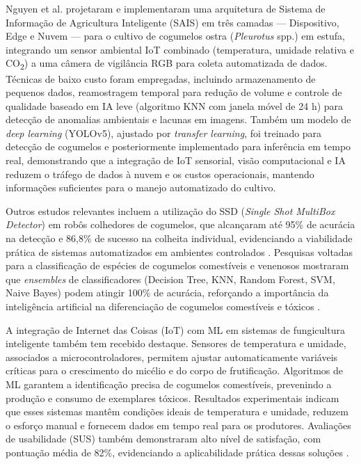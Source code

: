 \documentclass[11pt,a4paper]{article}
\begin{document}
Nguyen et al. \cite{Nguyen2024} projetaram e implementaram uma arquitetura de Sistema de Informação de Agricultura Inteligente (SAIS) em três camadas --- Dispositivo, Edge e Nuvem --- para o cultivo de cogumelos ostra (\textit{Pleurotus} spp.) em estufa, integrando um sensor ambiental IoT combinado (temperatura, umidade relativa e CO\textsubscript{2}) a uma câmera de vigilância RGB para coleta automatizada de dados. Técnicas de baixo custo foram empregadas, incluindo armazenamento de pequenos dados, reamostragem temporal para redução de volume e controle de qualidade baseado em IA leve (algoritmo KNN com janela móvel de 24 h) para detecção de anomalias ambientais e lacunas em imagens. Também um modelo de \textit{deep learning} (YOLOv5), ajustado por \textit{transfer learning}, foi treinado para detecção de cogumelos e posteriormente implementado para inferência em tempo real, demonstrando que a integração de IoT sensorial, visão computacional e IA reduzem o tráfego de dados à nuvem e os custos operacionais, mantendo informações suficientes para o manejo automatizado do cultivo.

Outros estudos relevantes incluem a utilização do SSD (\textit{Single Shot MultiBox Detector}) em robôs colhedores de cogumelos, que alcançaram até 95\% de acurácia na detecção e 86,8\% de sucesso na colheita individual, evidenciando a viabilidade prática de sistemas automatizados em ambientes controlados \cite{Qian2020}. Pesquisas voltadas para a classificação de espécies de cogumelos comestíveis e venenosos mostraram que \textit{ensembles} de classificadores (Decision Tree, KNN, Random Forest, SVM, Naive Bayes) podem atingir 100\% de acurácia, reforçando a importância da inteligência artificial na diferenciação de cogumelos comestíveis e tóxicos \cite{Rahman2021}.

A integração de Internet das Coisas (IoT) com ML em sistemas de fungicultura inteligente também tem recebido destaque. Sensores de temperatura e umidade, associados a microcontroladores, permitem ajustar automaticamente variáveis críticas para o crescimento do micélio e do corpo de frutificação. Algoritmos de ML garantem a identificação precisa de cogumelos comestíveis, prevenindo a produção e consumo de exemplares tóxicos. Resultados experimentais indicam que esses sistemas mantêm condições ideais de temperatura e umidade, reduzem o esforço manual e fornecem dados em tempo real para os produtores. Avaliações de usabilidade (SUS) também demonstraram alto nível de satisfação, com pontuação média de 82\%, evidenciando a aplicabilidade prática dessas soluções \cite{Rahman2021}.
\end{document}
